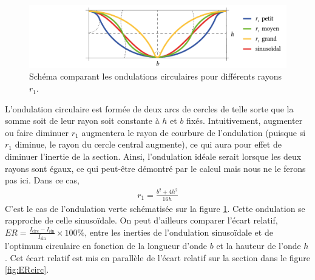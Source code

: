 \documentclass[11pt,titlepage]{article}
\begin{document}
\begin{figure}[H]
    \centering
    \includegraphics[width=0.8\linewidth]{img/ondul/circ2.pdf}
    \caption{Schéma comparant les ondulations circulaires pour différents rayons $r_1$.}
    \label{fig:ondcirc2}
\end{figure}
L'ondulation circulaire est formée de deux arcs de cercles de telle sorte que la somme soit de leur rayon soit constante à $h$ et $b$ fixés. Intuitivement, augmenter ou faire diminuer $r_1$ augmentera le rayon de courbure de l'ondulation (puisque si $r_1$ diminue, le rayon du cercle central augmente), ce qui aura pour effet de diminuer l'inertie de la section. Ainsi, l'ondulation idéale serait lorsque les deux rayons sont égaux, ce qui peut-être démontré par le calcul mais nous ne le ferons pas ici. Dans ce cas, 
\begin{align}
    r_1 = \frac{b^2+4h^2}{16h}
\end{align}
C'est le cas de l'ondulation verte schématisée sur la figure \ref{fig:ondcirc2}. Cette ondulation se rapproche de celle sinusoïdale. On peut d'ailleurs comparer l'écart relatif, $ER = \frac{I_{\text{circ}}-I_{\text{sin}}}{I_{\text{sin}}}\times 100\%$, entre les inerties de l'ondulation sinusoïdale et de l'optimum circulaire en fonction de la longueur d'onde $b$ et la hauteur de l'onde $h$. Cet écart relatif est mis en parallèle de l'écart relatif sur la section dans le figure \ref{fig:ERcirc}.
\\
\end{document}

